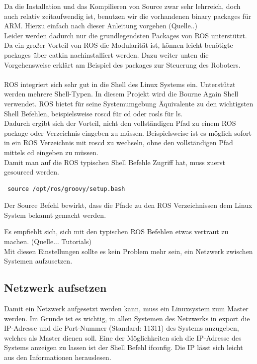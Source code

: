 \documentclass[12pt]{article}
\begin{document}
Da die Installation und das Kompilieren von Source zwar sehr lehrreich, doch auch relativ zeitaufwendig ist, benutzen wir die vorhandenen binary packages für ARM. 
Hierzu einfach nach dieser Anleitung vorgehen (Quelle..) \\
Leider werden dadurch nur die grundlegendsten Packages von ROS unterstützt.
Da ein großer Vorteil von ROS die Modularität ist, können leicht benötigte packages über catkin nachinstalliert werden.
Dazu weiter unten die Vorgehensweise erklärt am Beispiel des packages zur Steuerung des Roboters.\\
\\
ROS integriert sich sehr gut in die Shell des Linux Systems ein.
Unterstützt werden mehrere Shell-Typen. In diesem Projekt wird die Bourne Again Shell verwendet.
ROS bietet für seine Systemumgebung Äquivalente zu den wichtigsten Shell Befehlen, beispielsweise roscd für cd oder rosls für ls. \\
Dadurch ergibt sich der Vorteil, nicht den vollständigen Pfad zu einem ROS package oder Verzeichnis eingeben zu müssen. Beispielsweise ist es möglich sofort in ein ROS Verzeichnis mit roscd zu wechseln, ohne den vollständigen Pfad mittels cd eingeben zu müssen. \\
Damit man auf die ROS typischen Shell Befehle Zugriff hat, muss zuerst gesourced werden.

 \begin{lstlisting}
 source /opt/ros/groovy/setup.bash
 \end{lstlisting}

Der Source Befehl bewirkt, dass die Pfade zu den ROS Verzeichnissen dem Linux System bekannt gemacht werden.

Es empfiehlt sich, sich mit den typischen ROS Befehlen etwas vertraut zu machen. (Quelle... Tutorials) \\
Mit diesen Einstellungen sollte es kein Problem mehr sein, ein Netzwerk zwischen Systemen aufzusetzen.
\subsection{Netzwerk aufsetzen}
Damit ein Netzwerk aufgesetzt werden kann, muss ein Linuxsystem zum Master werden.
Im Grunde ist es wichtig, in allen Systemen des Netzwerks in export die IP-Adresse und die Port-Nummer (Standard: 11311) des Systems anzugeben, welches als Master dienen soll.
Eine der Möglichkeiten sich die IP-Adresse des Systems anzeigen zu lassen ist der Shell Befehl ifconfig.
Die IP lässt sich leicht aus den Informationen herauslesen.
\end{document}
